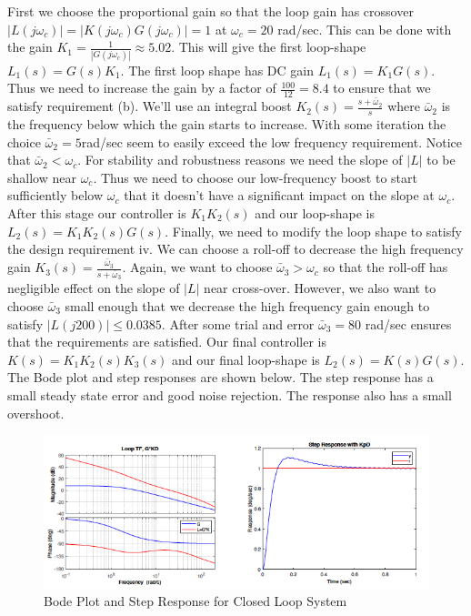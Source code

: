 \documentclass[12pt]{article}
\begin{document}
First we choose the proportional gain so that the loop gain has crossover $|L(j\omega_c)| =|K(j \omega_c) G(j \omega_c)| = 1$ at $\omega_c = 20$ rad/sec. This can be done with the gain $K_1 = \frac{1}{|G(j\omega_c)|} \approx 5.02$. This will give the first loop-shape $L_1(s) = G(s)K_1$. The first loop shape has DC gain $L_1(s) = K_1 G(s)$. Thus we need to increase the gain by a factor of $\frac{100}{12} = 8.4$ to ensure that we satisfy requirement (b). We'll use an integral boost 
$K_2(s) =\frac{s+\bar{\omega}_2}{s}$ where $\bar{\omega}_2$ is the frequency below which the gain starts to increase. With some iteration the choice $\bar{\omega}_2=5$rad/sec seem to easily exceed the low frequency requirement. Notice that $\bar{\omega}_2 < \omega_c$. For stability and robustness reasons we need the slope
of $|L|$ to be shallow near $\omega_c$. Thus we need to choose our low-frequency boost to start
sufficiently below $\omega_c$ that it doesn't have a significant impact on the slope at $\omega_c$. After
this stage our controller is $K_1 K_2(s)$ and our loop-shape is $L_2(s) = K_1 K_2(s)G(s)$.
Finally, we need to modify the loop shape to satisfy the design requirement iv. We can
choose a roll-off to decrease the high frequency gain $K_3(s) =\frac{\bar{\omega}_3}{s+\bar{\omega}_3}$. Again, we want to choose $\bar{\omega}_3 > \omega_c$ so that the roll-off has negligible effect on the slope of $|L|$ near cross-over. However, we also want to choose $\bar{\omega}_3$ small enough that we decrease the high frequency gain enough to satisfy $|L(j200)| \leq  0.0385$. After some trial and error $\bar{\omega}_3= 80$ rad/sec ensures that the requirements are satisfied. Our final controller is
$K(s) = K_1K_2(s)K_3(s)$ and our final loop-shape is $L_2(s) = K(s)G(s)$. The Bode plot and step responses are shown below. The step response has a small steady state error and good noise rejection. The response also has a small overshoot.

\begin{figure}[H]
    \centering
    \includegraphics[width=\linewidth]{figs/12.4.png}
    \caption{Bode Plot and Step Response for Closed Loop System }
    \label{fig:enter-label}
\end{figure}

\clearpage
\end{document}
